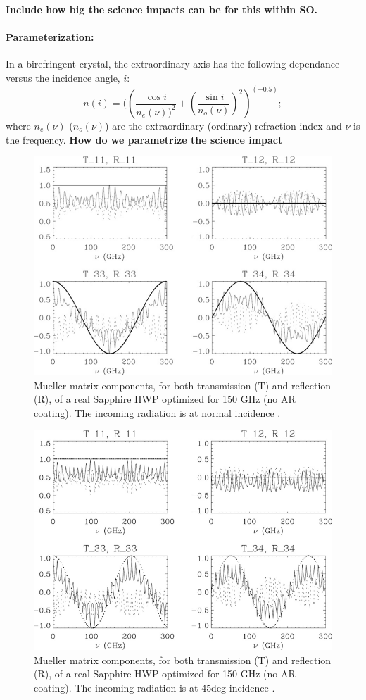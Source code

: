 \textbf{Include how big the science impacts can be for this within SO.}

\paragraph{Parameterization:}
In a birefringent crystal, the extraordinary axis has the following dependance versus the incidence angle, $i$:
\begin{equation}
n(i)=((\frac{\cos{i}}{n_e(\nu))^2}+(\frac{\sin{i}}{n_o(\nu)})^2)^{(-0.5)};
\end{equation}
where $n_e(\nu)$ ($n_o(\nu)$) are the extraordinary (ordinary) refraction index and $\nu$ is the frequency. \textbf{How do we parametrize the science impact}

\begin{figure}
\centering
\includegraphics[width=0.6\linewidth]{figures/0deg.png}
\caption{Mueller matrix components, for both transmission (T) and reflection (R), of a real Sapphire HWP
optimized for 150 GHz (no AR coating). The incoming radiation is at normal incidence \cite{Salatino17}.
}\label{0deg}
\end{figure}

\begin{figure}
\centering
\includegraphics[width=0.6\linewidth]{figures/45deg.png}
\caption{Mueller matrix components, for both transmission (T) and reflection (R), of a real Sapphire HWP
optimized for 150 GHz (no AR coating). The incoming radiation is at 45deg incidence \cite{Salatino17}.}\label{45deg}
\end{figure}


